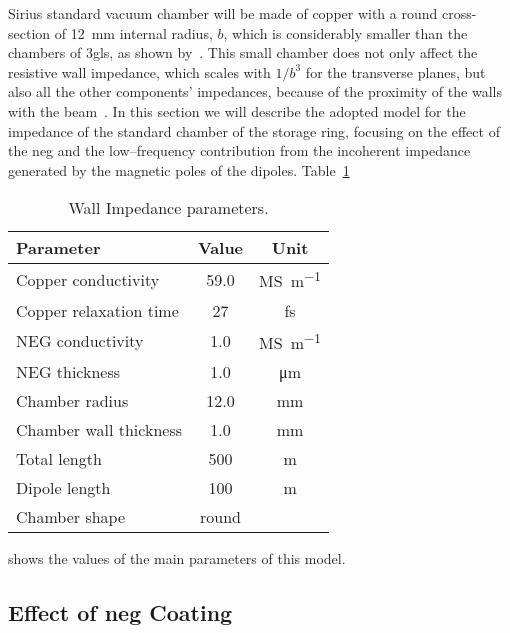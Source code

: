     Sirius standard vacuum chamber will be made of copper with a round cross-section of \SI{12}{\milli\meter} internal radius, $b$, which is considerably smaller than the chambers of \gls{3gls}, as shown by~.
    This small chamber does not only affect the resistive wall impedance, which scales with $1/b^3$ for the transverse planes, but also all the other components' impedances, because of the proximity of the walls with the beam~\cite{Nagaoka2014}.
    In this section we will describe the adopted model for the impedance of the standard chamber of the storage ring, focusing on the effect of the \gls{neg} and the low--frequency contribution from the  incoherent impedance generated by the magnetic poles of the dipoles. Table~\ref{tab:wall_impedance_parameters}
    \begin{table}
        \centering
        \caption{Wall Impedance parameters.}
        \label{tab:wall_impedance_parameters}
        \begin{tabular}{lcc}
            \toprule
            Parameter              &   Value    & Unit \\
            \midrule
            Copper conductivity    &   59.0     & \si{\mega\siemens\per\meter}\\
            Copper relaxation time &   27       & \si{\femto\second}\\
            NEG conductivity       &   1.0      & \si{\mega\siemens\per\meter}\\
            NEG thickness          &   1.0      & \si{\micro\meter}\\
            Chamber radius         &  12.0      & \si{\milli\meter}\\
            Chamber wall thickness &   1.0      & \si{\milli\meter}\\
            Total length           &  500       & \si{\meter}\\
            Dipole length          &  100       & \si{\meter}\\
            Chamber shape          & round      & \\
            \bottomrule
        \end{tabular}
    \end{table}
    shows the values of the main parameters of this model.

\subsection{Effect of \gls{neg} Coating}

